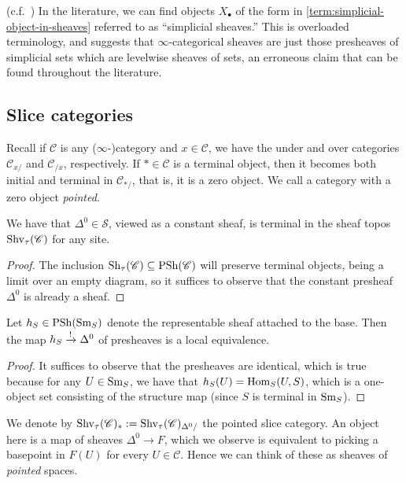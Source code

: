 \documentclass[11pt]{amsart}
\begin{document}
\begin{warning} (c.f.~\cite[7.1.3.1]{HTT}) In the literature, we can find objects $X_\bullet$ of the form in \autoref{term:simplicial-object-in-sheaves} referred to as ``simplicial sheaves.'' This is overloaded terminology, and suggests that $\infty$-categorical sheaves are just those presheaves of simplicial sets which are levelwise sheaves of sets, an erroneous claim that can be found throughout the literature.
\end{warning}

\subsection{Slice categories}

Recall if $\mathscr{C}$ is any ($\infty$-)category and $x\in \mathscr{C}$, we have the under and over categories $\mathscr{C}_{x/}$ and $\mathscr{C}_{/x}$, respectively. If $\ast\in \mathscr{C}$ is a terminal object, then it becomes both initial and terminal in $\mathscr{C}_{\ast/}$, that is, it is a zero object. We call a category with a zero object \textit{pointed}.

\begin{proposition} We have that $\Delta^0 \in \mathcal{S}$, viewed as a constant sheaf, is terminal in the sheaf topos $\mathrm{Shv}_\tau(\mathscr{C})$ for any site.
\end{proposition}
\begin{proof}
The inclusion $\mathrm{Sh}_\tau(\mathscr{C}) \subseteq \mathrm{PSh}(\mathscr{C})$ will preserve terminal objects, being a limit over an empty diagram, so it suffices to observe that the constant presheaf $\Delta^0$ is already a sheaf.
\end{proof}

\begin{proposition}\label{prop:terminal-object-sheaves} 
Let $h_S \in \mathrm{PSh}(\mathrm{Sm}_S)$ denote the representable sheaf attached to the base. Then the map $h_S \xrightarrow{!} \Delta^0$ of presheaves is a local equivalence.
\end{proposition}
\begin{proof} It suffices to observe that the presheaves are identical, which is true because for any $U\in \mathrm{Sm}_S$, we have that $h_S(U) = \mathrm{Hom}_S(U,S)$, which is a one-object set consisting of the structure map (since $S$ is terminal in $\mathrm{Sm}_S$).
\end{proof}

\begin{notation} We denote by $\mathrm{Shv}_\tau(\mathscr{C})_\ast := \mathrm{Shv}_\tau(\mathscr{C})_{\Delta^0/}$ the pointed slice category. An object here is a map of sheaves $\Delta^0 \to F$, which we observe is equivalent to picking a basepoint in $F(U)$ for every $U \in \mathscr{C}$. Hence we can think of these as sheaves of \textit{pointed} spaces.
\end{notation}
\end{document}
